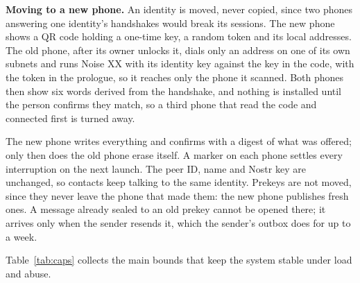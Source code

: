 \documentclass[conference]{IEEEtran}
\begin{document}
\textbf{Moving to a new phone.} An identity is moved, never copied, since two phones answering one identity's handshakes would break its sessions. The new phone shows a QR code holding a one-time key, a random token and its local addresses. The old phone, after its owner unlocks it, dials only an address on one of its own subnets and runs Noise XX with its identity key against the key in the code, with the token in the prologue, so it reaches only the phone it scanned. Both phones then show six words derived from the handshake, and nothing is installed until the person confirms they match, so a third phone that read the code and connected first is turned away.

The new phone writes everything and confirms with a digest of what was offered; only then does the old phone erase itself. A marker on each phone settles every interruption on the next launch. The peer ID, name and Nostr key are unchanged, so contacts keep talking to the same identity. Prekeys are not moved, since they never leave the phone that made them: the new phone publishes fresh ones. A message already sealed to an old prekey cannot be opened there; it arrives only when the sender resends it, which the sender's outbox does for up to a week.

Table~\ref{tab:caps} collects the main bounds that keep the system stable under load and abuse.
\end{document}
